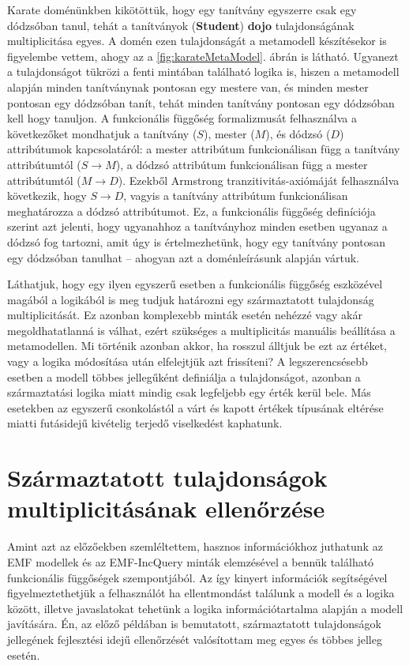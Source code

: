 Karate doménünkben kikötöttük, hogy egy tanítvány egyszerre csak egy dódzsóban tanul, tehát a tanítványok (\textbf{Student}) \textbf{dojo} tulajdonságának multiplicitása egyes.
A domén ezen tulajdonságát a metamodell készítésekor is figyelembe vettem, ahogy az a \ref{fig:karateMetaModel}. ábrán is látható.
Ugyanezt a tulajdonságot tükrözi a fenti mintában található logika is, hiszen a metamodell alapján minden tanítványnak pontosan egy mestere van, és minden mester pontosan egy dódzsóban tanít, tehát minden tanítvány pontosan egy dódzsóban kell hogy tanuljon.
A funkcionális függőség formalizmusát felhasználva a következőket mondhatjuk a tanítvány ($S$), mester ($M$), és dódzsó ($D$) attribútumok kapcsolatáról: a mester attribútum funkcionálisan függ a tanítvány attribútumtól ($S \rightarrow M$), a dódzsó attribútum funkcionálisan függ a mester attribútumtól ($M \rightarrow D$).
Ezekből Armstrong tranzitivitás-axiómáját felhasználva következik, hogy $S \rightarrow D$, vagyis a tanítvány attribútum funkcionálisan meghatározza a dódzsó attribútumot.
Ez, a funkcionális függőség definíciója szerint azt jelenti, hogy ugyanahhoz a tanítványhoz minden esetben ugyanaz a dódzsó fog tartozni, amit úgy is értelmezhetünk, hogy egy tanítvány pontosan egy dódzsóban tanulhat -- ahogyan azt a doménleírásunk alapján vártuk.

Láthatjuk, hogy egy ilyen egyszerű esetben a funkcionális függőség eszközével magából a logikából is meg tudjuk határozni egy származtatott tulajdonság multiplicitását.
Ez azonban komplexebb minták esetén nehézzé vagy akár megoldhatatlanná is válhat, ezért szükséges a multiplicitás manuális beállítása a metamodellen.
Mi történik azonban akkor, ha rosszul álltjuk be ezt az értéket, vagy a logika módosítása után elfelejtjük azt frissíteni?
A legszerencsésebb esetben a modell többes jellegűként definiálja a tulajdonságot, azonban a származtatási logika miatt mindig csak legfeljebb egy érték kerül bele. Más esetekben az egyszerű csonkolástól a várt és kapott értékek típusának eltérése miatti futásidejű kivételig terjedő viselkedést kaphatunk.

\section{Származtatott tulajdonságok multiplicitásának ellenőrzése}

Amint azt az előzőekben szemléltettem, hasznos információkhoz juthatunk az \gls{EMF} modellek és az EMF-IncQuery minták elemzésével a bennük található funkcionális függőségek szempontjából.
Az így kinyert információk segítségével figyelmeztethetjük a felhasználót ha ellentmondást találunk a modell és a logika között, illetve javaslatokat tehetünk a logika információtartalma alapján a modell javítására.
Én, az előző példában is bemutatott, származtatott tulajdonságok jellegének fejlesztési idejű ellenőrzését valósítottam meg egyes és többes jelleg esetén.

